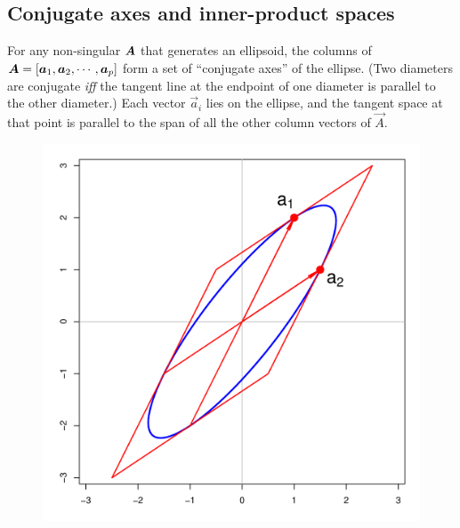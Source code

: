 \subsection{Conjugate axes and inner-product spaces}\label{sec:conjugate}

For any non-singular $\bm{A}$ that generates an ellipsoid,  %
the columns of
$\bm{A}=\left[
   \bm{a}_{1}, \bm{a}_{2}, \cdots, \bm{a}_{p}  \\
\right]
$
form a set of ``conjugate axes'' of the ellipse. (Two diameters are conjugate \emph{iff}
the tangent line at the endpoint of one diameter is parallel to the other diameter.)
Each vector
$\vec{a}_{i}$
lies on the ellipse, and the tangent space at that point is parallel to the span of all the other column vectors of
$\vec{A}$.
\begin{figure}[htb]
 \begin{minipage}[b]{.49\linewidth}
  \centering
  \includegraphics[width=1\linewidth]{fig/conjugate1}
 \end{minipage}%
 \hfill
 \begin{minipage}[b]{.49\linewidth}
  \centering

\end{minipage}
\end{figure}
